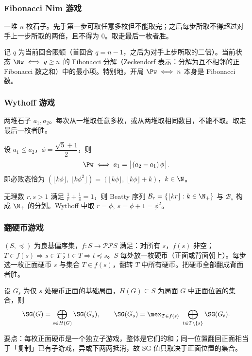 \subsubsection{Fibonacci Nim 游戏}
\begin{game}
	一堆 $n$ 枚石子。先手第一步可取任意多枚但不能取完；之后每步所取不得超过对手上一步所取的两倍，且不得为 $0$。取走最后一枚者胜。
\end{game}
\begin{theorem}[Zeckendorf]
	记 $q$ 为当前回合限额（首回合 $q=n-1$，之后为对手上步所取的二倍）。当前状态 $\Nw \iff q\ge n$ 的 Fibonacci 分解（Zeckendorf 表示：分解为互不相邻的正 Fibonacci 数之和）中的最小项。特别地，开局 $\Pw \iff n$ 本身是 Fibonacci 数。
\end{theorem}

\subsubsection{Wythoff 游戏}
\begin{game}[Wythoff]
	两堆石子 $a_1,a_2$。每次从一堆取任意多枚，或从两堆取相同数目，不能不取。取走最后一枚者胜。
\end{game}
\begin{theorem}
	设 $a_1\le a_2$，$\phi=\dfrac{\sqrt5+1}{2}$，则
	$$\Pw \iff a_1=\big\lfloor(a_2-a_1)\,\phi\big\rfloor.$$
	即必败态恰为 $(\lfloor k\phi\rfloor,\ \lfloor k\phi^2\rfloor)=(\lfloor k\phi\rfloor,\ \lfloor k\phi\rfloor+k)$，$k\in\N$。
\end{theorem}
\begin{lemma}
	无理数 $r,s>1$ 满足 $\frac1r+\frac1s=1$，则 Beatty 序列 $\mathcal B_r=\{\lfloor kr\rfloor:k\in\N_+\}$ 与 $\mathcal B_s$ 构成 $\N_+$ 的分划。Wythoff 中取 $r=\phi,\ s=\phi+1=\phi^2$。
\end{lemma}

\subsubsection{翻硬币游戏}
\begin{game}[翻硬币]
	$(S,\preceq)$ 为良基偏序集，$f:S\to\mathcal{P}\mathcal{P}S$ 满足：对所有 $s$，$f(s)$ 非空；$T\in f(s)\Rightarrow s\in T$；$t\in T\Rightarrow t\preceq s$。$S$ 每处放一枚硬币（正面或背面朝上）。每步选一枚正面硬币 $s$ 与集合 $T\in f(s)$，翻转 $T$ 中所有硬币。把硬币全部翻成背面者胜。
\end{game}
\begin{theorem}
	设 $G_s$ 为仅 $s$ 处硬币正面的基础局面，$H(G)\subseteq S$ 为局面 $G$ 中正面位置的集合，则
	$$\SG(G)=\bigoplus_{s\in H(G)}\SG(G_s),\qquad
	\SG(G_s)=\mex_{T\in f(s)}\ \bigoplus_{t\in T\setminus\{s\}}\SG(G_t).$$
\end{theorem}
要点：每枚正面硬币是一个独立子游戏，整体是它们的和；同一位置翻回正面相当于「复制」已有子游戏，异或下两两抵消，故 SG 值只取决于正面位置的集合。

